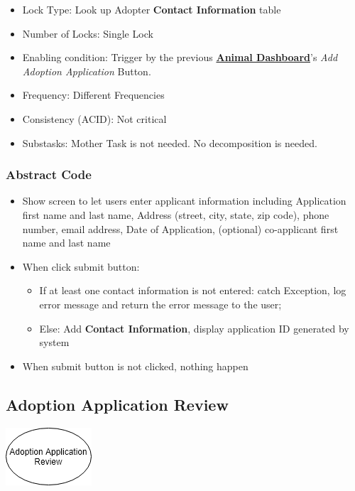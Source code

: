 \documentclass[a4paper]{article}
\begin{document}
\begin{itemize}
	\item Lock Type: Look up Adopter \textbf{Contact Information} table
	\item Number of Locks: Single Lock
	\item Enabling condition: Trigger by the previous \underline{\textbf{Animal Dashboard}}'s \textit{Add Adoption Application} Button.
	\item Frequency: Different Frequencies
	\item Consistency (ACID): Not critical
	\item Substasks:  Mother Task is not needed. No decomposition is needed.
\end{itemize}

\subsubsection*{Abstract Code}

\begin{itemize}
	\item Show screen to let users enter applicant information including Application first name and last name, Address (street, city, state, zip code), phone number, email address, Date of Application, (optional) co-applicant first name and last name
	\item When click submit button:
	\begin{itemize}
	    \item If at least one contact information is not entered: catch Exception, log error message and return the error message to the user;
	    \item Else: Add \textbf{Contact Information}, display application ID generated by system
	\end{itemize}
	\item When submit button is not clicked, nothing happen

\end{itemize}



\hypertarget{adoption_app_review}{\subsection{Adoption Application Review}}
\includegraphics[scale = 0.6]{adoption_app_review.png}
\end{document}
